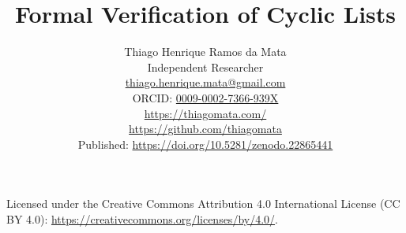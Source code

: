 \documentclass[11pt]{article}
\title{Formal Verification of Cyclic Lists}
\author{%
  Thiago Henrique Ramos da Mata\\
  \small Independent Researcher\\
  \small \href{mailto:thiago.henrique.mata@gmail.com}{thiago.henrique.mata@gmail.com}\\
  \small ORCID: \href{https://orcid.org/0009-0002-7366-939X}{0009-0002-7366-939X}\\
  \small \url{https://thiagomata.com/}\\
  \small \url{https://github.com/thiagomata}\\
  \small Published: \url{https://doi.org/10.5281/zenodo.22865441}
}
\date{}
\begin{document}
\maketitle



\begin{center}
  \small Licensed under the Creative Commons Attribution 4.0 International
  License (CC BY 4.0): \url{https://creativecommons.org/licenses/by/4.0/}.
\end{center}
















\appendix

\end{document}

